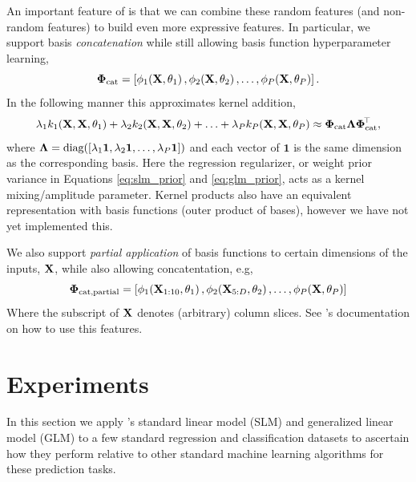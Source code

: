 \documentclass[11pt, oneside]{article}
\begin{document}
An important feature of \revrand{} is that we can combine these random features
(and non-random features) to build even more expressive features. In
particular, we support basis \emph{concatenation} while still allowing basis
function hyperparameter learning,
\begin{equation}
    \feat_{\text{cat}} = \sbrac{
        \func{\featsym}{\ins, \param_1}{1},
        \func{\featsym}{\ins, \param_2}{2},
        \ldots,
        \func{\featsym}{\ins, \param_P}{P}
    }.
\end{equation}
In the following manner this approximates kernel addition,
\begin{equation}
    \reg_1 \kernl_1\!\brac{\ins, \ins, \param_1} +
    \reg_2 \kernl_2\!\brac{\ins, \ins, \param_2} + \ldots +
    \reg_P \kernl_P\!\brac{\ins, \ins, \param_P} \approx
    \feat_{\text{cat}} \Reg \feat_{\text{cat}}\T,
\end{equation}
where $\Reg = \diag{\sbrac{\reg_1 \mathbf{1}, \reg_2 \mathbf{1}, \ldots, \reg_P
        \mathbf{1}}}$ and each vector of $\mathbf{1}$ is the same dimension as
the corresponding basis. Here the regression regularizer, or weight prior
variance in Equations \eqref{eq:slm_prior} and \eqref{eq:glm_prior}, acts as a
kernel mixing/amplitude parameter.  Kernel products also have an equivalent
representation with basis functions (outer product of bases), however we have
not yet implemented this.

We also support \emph{partial application} of basis functions to certain
dimensions of the inputs, $\ins$, while also allowing concatentation, e.g,
\begin{equation}
    \feat_{\text{cat,partial}} = \sbrac{
        \func{\featsym}{\ins_{1:10}, \param_1}{1},
        \func{\featsym}{\ins_{5:D}, \param_2}{2},
        \ldots,
        \func{\featsym}{\ins, \param_P}{P}
    } 
\end{equation}
Where the subscript of $\ins$ denotes (arbitrary) column slices. See
\revrand{}'s documentation on how to use this features.


\section{Experiments}

In this section we apply \revrand{}'s standard linear model (SLM) and
generalized linear model (GLM) to a few standard regression and classification
datasets to ascertain how they perform relative to other standard machine
learning algorithms for these prediction tasks.
\end{document}
